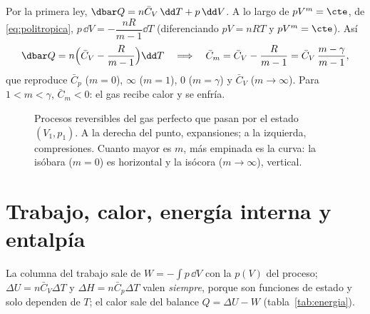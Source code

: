 \documentclass[11pt,a4paper]{article}
\newcommand{\Cv}{\bar C_V}
\newcommand{\Cp}{\bar C_p}
\begin{document}
\begin{observacion}
Por la primera ley, $\dbar Q=n\Cv\,\dd T+p\,\dd V$. A lo largo de $pV^m=\cte$, de \eqref{eq:politropica},
$p\,\dd V=-\dfrac{nR}{m-1}\dd T$ (diferenciando $pV=nRT$ y $pV^m=\cte$). Así
\[
  \dbar Q=n\Bigl(\Cv-\frac{R}{m-1}\Bigr)\dd T\quad\Longrightarrow\quad
  \bar C_m=\Cv-\frac{R}{m-1}=\Cv\,\frac{m-\gamma}{m-1},
\]
que reproduce $\Cp$ ($m=0$), $\infty$ ($m=1$), $0$ ($m=\gamma$) y $\Cv$ ($m\to\infty$). Para $1<m<\gamma$,
$\bar C_m<0$: el gas recibe calor y se enfría.
\end{observacion}

\begin{figure}[htbp]
\centering
{}
\caption{Procesos reversibles del gas perfecto que pasan por el estado $(V_1,p_1)$. A la derecha del punto,
expansiones; a la izquierda, compresiones. Cuanto mayor es $m$, más empinada es la curva: la isóbara ($m=0$)
es horizontal y la isócora ($m\to\infty$), vertical.}
\label{fig:procesos}
\end{figure}

\section{Trabajo, calor, energía interna y entalpía}

La columna del trabajo sale de $W=-\int p\,\dd V$ con la $p(V)$ del proceso; $\Delta U=n\Cv\Delta T$ y
$\Delta H=n\Cp\Delta T$ valen \emph{siempre}, porque son funciones de estado y solo dependen de $T$; el calor
sale del balance $Q=\Delta U-W$ (tabla~\ref{tab:energia}).
\end{document}
